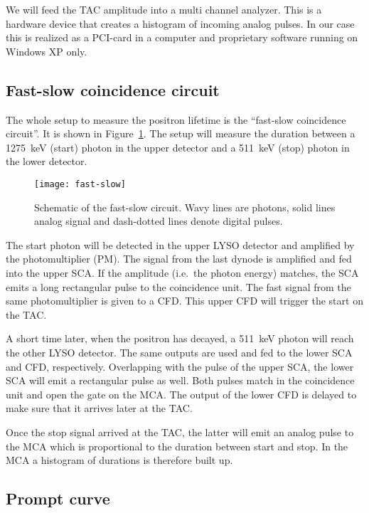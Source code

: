 \documentclass[11pt, english, fleqn, DIV=15, headinclude, BCOR=2cm]{scrreprt}
\begin{document}
We will feed the TAC amplitude into a multi channel analyzer. This is a
hardware device that creates a histogram of incoming analog pulses. In our case
this is realized as a PCI-card in a computer and proprietary software running
on Windows XP only.

\subsection{Fast-slow coincidence circuit}

The whole setup to measure the positron lifetime is the \enquote{fast-slow
coincidence circuit}. It is shown in Figure~\ref{fig:fast-slow}. The setup will
measure the duration between a \SI{1275}{\kilo\electronvolt} (start) photon in
the upper detector and a \SI{511}{\kilo\electronvolt} (stop) photon in the
lower detector.

\begin{figure}
    \centering
    \texttt{[image: fast-slow]}
    \caption{%
        Schematic of the fast-slow circuit. Wavy lines are photons, solid lines
        analog signal and dash-dotted lines denote digital pulses.
    }
    \label{fig:fast-slow}
\end{figure}

The start photon will be detected in the upper LYSO detector and amplified by
the photomultiplier (PM). The signal from the last dynode is amplified and fed
into the upper SCA\@. If the amplitude (i.e.\ the photon energy) matches, the SCA
emits a long rectangular pulse to the coincidence unit. The fast signal from
the same photomultiplier is given to a CFD\@. This upper CFD will trigger the
start on the TAC\@.

A short time later, when the positron has decayed, a
\SI{511}{\kilo\electronvolt} photon will reach the other LYSO detector. The
same outputs are used and fed to the lower SCA and CFD, respectively.
Overlapping with the pulse of the upper SCA, the lower SCA will emit a
rectangular pulse as well. Both pulses match in the coincidence unit and open
the gate on the MCA\@. The output of the lower CFD is delayed to make sure that
it arrives later at the TAC\@.

Once the stop signal arrived at the TAC, the latter will emit an analog pulse
to the MCA which is proportional to the duration between start and stop. In the
MCA a histogram of durations is therefore built up.

\subsection{Prompt curve}
\end{document}

